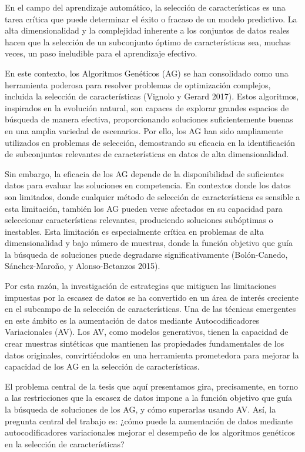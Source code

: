 
En el campo del aprendizaje automático, la selección de características es una tarea crítica que puede determinar el éxito o fracaso de un modelo predictivo. La alta dimensionalidad y la complejidad inherente a los conjuntos de datos reales hacen que la selección de un subconjunto óptimo de características sea, muchas veces, un paso ineludible para el aprendizaje efectivo.

En este contexto, los Algoritmos Genéticos (AG) se han consolidado como una herramienta poderosa para resolver problemas de optimización complejos, incluida la selección de características (Vignolo y Gerard 2017). Estos algoritmos, inspirados en la evolución natural, son capaces de explorar grandes espacios de búsqueda de manera efectiva, proporcionando soluciones suficientemente buenas en una amplia variedad de escenarios. Por ello, los AG han sido ampliamente utilizados en problemas de selección, demostrando su eficacia en la identificación de subconjuntos relevantes de características en datos de alta dimensionalidad.

Sin embargo, la eficacia de los AG depende de la disponibilidad de suficientes datos para evaluar las soluciones en competencia. En contextos donde los datos son limitados, donde cualquier método de selección de características es sensible a esta limitación, también los AG pueden verse afectados en su capacidad para seleccionar características relevantes, produciendo soluciones subóptimas o inestables. Esta limitación es especialmente crítica en problemas de alta dimensionalidad y bajo número de muestras, donde la función objetivo que guía la búsqueda de soluciones puede degradarse significativamente (Bolón-Canedo, Sánchez-Maroño, y Alonso-Betanzos 2015).

Por esta razón, la investigación de estrategias que mitiguen las limitaciones impuestas por la escasez de datos se ha convertido en un área de interés creciente en el subcampo de la selección de características. Una de las técnicas emergentes en este ámbito es la aumentación de datos mediante Autocodificadores Variacionales (AV). Los AV, como modelos generativos, tienen la capacidad de crear muestras sintéticas que mantienen las propiedades fundamentales de los datos originales, convirtiéndolos en una herramienta prometedora para mejorar la capacidad de los AG en la selección de características.

El problema central de la tesis que aquí presentamos gira, precisamente, en torno a las restricciones que la escasez de datos impone a la función objetivo que guía la búsqueda de soluciones de los AG, y cómo superarlas usando AV. Así, la pregunta central del trabajo es: ¿cómo puede la aumentación de datos mediante autocodificadores variacionales mejorar el desempeño de los algoritmos genéticos en la selección de características?


